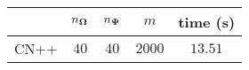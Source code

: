 \centering
\renewcommand{\arraystretch}{1.2}
\begin{tabular}{@{}lcccc@{}}
\toprule
 & $n_{\boldsymbol{\Omega}}$ & $n_{\boldsymbol{\Psi}}$ & $m$ & time (s)\\
\midrule
CN++ & $40$ & $40$ & $2000$ & $13.51$ \\
\bottomrule
\end{tabular}
